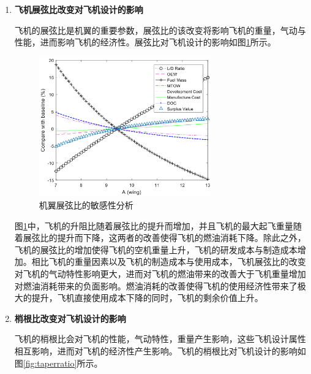 \documentclass[12pt,a4paper]{report}
\begin{document}
\begin{enumerate}
\item \textbf{飞机展弦比改变对飞机设计的影响}

飞机的展弦比是机翼的重要参数，展弦比的该改变将影响飞机的重量，气动与性能，进而影响飞机的经济性。展弦比对飞机设计的影响如图\ref{fig:aspectratio}所示。

\begin{figure}[htp]
  \centering
  \includegraphics[width=0.7\textwidth]{./media4/aspectratio.png}
  \caption{机翼展弦比的敏感性分析}
  \label{fig:aspectratio}
\end{figure}

图\ref{fig:aspectratio}中，飞机的升阻比随着展弦比的提升而增加，并且飞机的最大起飞重量随着展弦比的提升而下降，这两者的改善使得飞机的燃油消耗下降。除此之外，飞机的展弦比的增加使得飞机的空机重量上升，飞机的研发成本与制造成本增加。相比飞机的重量因素以及飞机的制造成本与使用成本，飞机展弦比的改变对飞机的气动特性影响更大，进而对飞机的燃油带来的改善大于飞机重量增加对燃油消耗带来的负面影响。燃油消耗的改善使得飞机的使用经济性带来了极大的提升，飞机直接使用成本下降的同时，飞机的剩余价值上升。

\item \textbf{梢根比改变对飞机设计的影响}

飞机的梢根比会对飞机的性能，气动特性，重量产生影响，这些飞机设计属性相互影响，进而对飞机的经济性产生影响。飞机的梢根比对飞机设计的影响如图\ref{fig:taperratio}所示。


\end{enumerate}
\end{document}
